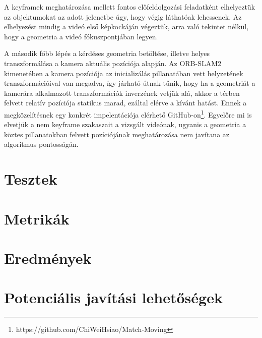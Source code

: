 A keyframek meghatározása mellett fontos előfeldolgozási feladatként elhelyeztük az objektumokat az adott jelenetbe úgy, hogy végig láthatóak lehessenek.
Az elhelyezést mindig a videó első képkockáján végeztük, arra való tekintet nélkül, hogy a geometria a videó fókuszpontjában legyen.

A második főbb lépés a kérdéses geometria betöltése, illetve helyes transzformálása a kamera aktuális pozíciója alapján.
Az ORB-SLAM2 kimenetében a kamera pozíciója az inicializálás pillanatában vett helyzetének transzformációival van megadva, így járható útnak tűnik, hogy ha a geometriát a kamerára alkalmazott transzformációk inverzének vetjük alá, akkor a térben felvett relatív pozíciója statikus marad, ezáltal elérve a kívánt hatást.
Ennek a megközelítésnek egy konkrét impelentációja elérhető GitHub-on\footnote{https://github.com/ChiWeiHsiao/Match-Moving}.
Egyelőre mi is elvetjük a nem keyframe szakaszait a vizsgált videónak, ugyanis a geometria a köztes pillanatokban felvett pozíciójának meghatározása nem javítana az algoritmus pontosságán.


\section{Tesztek}

\section{Metrikák}

\section{Eredmények}

\section{Potenciális javítási lehetőségek}

